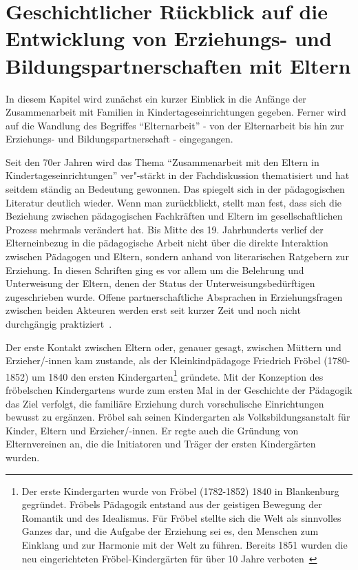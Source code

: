 \documentclass[12pt,a4paper]{article}
\begin{document}
\section{Geschichtlicher Rückblick auf die Entwicklung von Erziehungs- und Bildungspartnerschaften mit Eltern}
In diesem Kapitel wird zunächst ein kurzer Einblick in die Anfänge der Zusammenarbeit mit Familien in Kindertageseinrichtungen gegeben. Ferner wird auf die Wandlung des Begriffes "`Elternarbeit"' -  von der Elternarbeit bis hin zur Erziehungs- und Bildungspartnerschaft - eingegangen.

	 Seit den 70er Jahren wird das Thema "`Zusammenarbeit mit den Eltern in  Kindertageseinrichtungen"' ver"-stärkt in der Fachdiskussion thematisiert und hat seitdem ständig an Bedeutung gewonnen. Das spiegelt sich in der pädagogischen Literatur deutlich wieder. Wenn man zurückblickt, stellt man fest, dass sich die Beziehung zwischen pädagogischen Fachkräften und Eltern im gesellschaftlichen Prozess mehrmals verändert hat. Bis Mitte des 19. Jahrhunderts verlief der Elterneinbezug in die pädagogische Arbeit nicht über die direkte Interaktion zwischen Pädagogen und Eltern, sondern anhand von literarischen Ratgebern zur Erziehung. In diesen Schriften ging es vor allem um die Belehrung und Unterweisung der Eltern, denen der Status der Unterweisungsbedürftigen zugeschrieben wurde. Offene partnerschaftliche Absprachen in Erziehungsfragen zwischen beiden Akteuren werden erst seit kurzer Zeit und noch nicht durchgängig praktiziert~\parencite[S.~43]{Wiezorek}.
	 
	Der erste Kontakt zwischen Eltern oder, genauer gesagt, zwischen Müttern und Erzieher/-innen kam zustande, als der Kleinkindpädagoge Friedrich Fröbel (1780-1852) um 1840 den ersten Kindergarten\footnote{Der erste Kindergarten wurde von Fröbel (1782-1852) 1840 in Blankenburg gegründet. Fröbels Pädagogik entstand aus der geistigen Bewegung der Romantik und des Idealismus. Für Fröbel stellte sich die Welt als sinnvolles Ganzes dar, und die Aufgabe der Erziehung sei es, den Menschen zum Einklang und zur Harmonie mit der Welt zu führen. Bereits 1851 wurden die neu eingerichteten Fröbel-Kindergärten für über 10 Jahre verboten~\parencite[S.~10-22]{Berger}} gründete. Mit der Konzeption des fröbelschen Kindergartens wurde zum ersten Mal in der Geschichte der Pädagogik das Ziel verfolgt, die familiäre Erziehung durch vorschulische Einrichtungen bewusst zu ergänzen. Fröbel sah seinen Kindergarten als Volksbildungsanstalt für Kinder, Eltern und Erzieher/-innen. Er regte auch die Gründung von Elternvereinen an, die die Initiatoren und Träger der ersten Kindergärten wurden.
	
\end{document}
